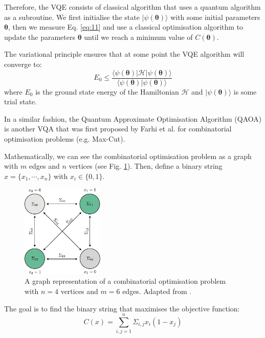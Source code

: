 \documentclass[prx,twocolumn,floatfix,superscriptaddress,longbibliography]{revtex4-1}
\begin{document}
Therefore, the VQE consists of classical algorithm that uses a quantum algorithm as a subroutine. We first initialise the state 
$|\psi(\boldsymbol{\theta})\rangle$ with some initial parameters $\boldsymbol{\theta}$, then we measure Eq. \ref{eq:11} and use a classical optimisation algorithm to update 
the parameters $\boldsymbol{\theta}$ until we reach a minimum value of $C(\boldsymbol{\theta})$.

The variational principle ensures that at some point the VQE algorithm will converge to:
\begin{equation}
  \label{eq:13}
  E_0 \leq \frac{\langle \psi(\boldsymbol{\theta})|\mathcal{H}|\psi(\boldsymbol{\theta})\rangle}{\langle \psi(\boldsymbol{\theta})|\psi(\boldsymbol{\theta})\rangle}
\end{equation}
where $E_0$ is the ground state energy of the Hamiltonian $\mathcal{H}$ and $|\psi(\boldsymbol{\theta})\rangle$ is some trial state.

In a similar fashion, the Quantum Approximate Optimisation Algorithm (QAOA) is another VQA that was first 
proposed by Farhi et al. \cite{Farhi2014} for combinatorial optimisation problems (e.g. Max-Cut).

Mathematically, we can see the combinatorial optimisation problem as a graph with $m$ edges and $n$ vertices (see Fig. \ref{fig:combinatorial}). Then, define a binary string $x = \{x_1,\cdots, x_n\}$ with $x_i \in \{0, 1\}$. 
\begin{figure}[h!]
\centering 
\includegraphics[width=0.35\textwidth]{combinatorial-problem.pdf}
  \caption{\label{fig:combinatorial} A graph representation of a combinatorial optimisation problem with $n =4$ vertices and $m=6$ edges. Adapted from \cite{Baker2022}.} 
\end{figure}
The goal is to find the binary string that maximises the objective function: 
\begin{equation}
  \label{eq:14}
  C(x) = \sum_{i,j=1}^{n} \Sigma_{i,j} x_i (1-x_j)
\end{equation}
\end{document}
